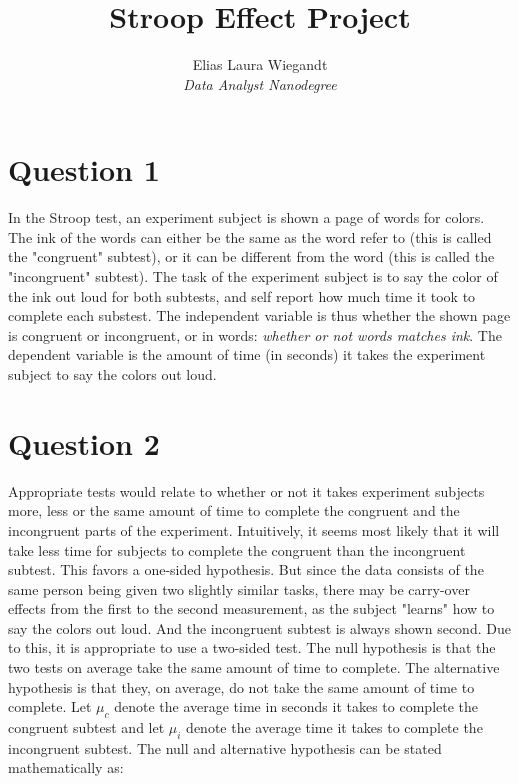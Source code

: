 \documentclass[12pt]{article}
\begin{document}
  
\title{Stroop Effect Project}
\author{Elias Laura Wiegandt\\ 
\textit{Data Analyst Nanodegree}}
 
\maketitle

\section{Question 1}
In the Stroop test, an experiment subject is shown a page of words for colors. The ink of the words can either be the same as the word refer to (this is called the "congruent" subtest), or it can be different from the word (this is called the "incongruent" subtest). The task of the experiment subject is to say the color of the ink out loud for both subtests, and self report how much time it took to complete each substest.
The independent variable is thus whether the shown page is congruent or incongruent, or in words: \textit{whether or not words matches ink}. \newline
The dependent variable is the amount of time (in seconds) it takes the experiment subject to say the colors out loud.

\section{Question 2}
Appropriate tests would relate to whether or not it takes experiment subjects more, less or the same amount of time to complete the congruent and the incongruent parts of the experiment. \newline
Intuitively, it seems most likely that it will take less time for subjects to complete the congruent than the incongruent subtest. This favors a one-sided hypothesis. But since the data consists of the same person being given two slightly similar tasks, there may be carry-over effects from the first to the second measurement, as the subject "learns" how to say the colors out loud. And the incongruent subtest is always shown second.
Due to this, it is appropriate to use a two-sided test.
\newline
The null hypothesis is that the two tests on average take the same amount of time to complete. The alternative hypothesis is that they, on average, do not take the same amount of time to complete. Let $\mu_{c}$ denote the average time in seconds it takes to complete the congruent subtest and let $\mu_{i}$ denote the average time it takes to complete the incongruent subtest. The null and alternative hypothesis can be stated mathematically as:
\end{document}
